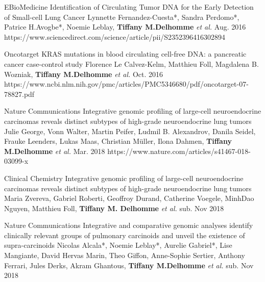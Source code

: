 \begin{cventries}
  \cvpublicationentry
    {EBioMedicine} %
    {Identification of Circulating Tumor DNA for the Early Detection of Small-cell Lung Cancer} %
    {Lynnette Fernandez-Cuesta*, Sandra Perdomo*, Patrice H.Avogbe*, Noemie Leblay, \textbf{Tiffany M.Delhomme} \textit{et al.}} %
    {}
    {Aug. 2016} %
    {https://www.sciencedirect.com/science/article/pii/S2352396416302894}

  \cvpublicationentry
    {Oncotarget} %
    {KRAS mutations in blood circulating cell-free DNA: a pancreatic
cancer case-control study} %
    {Florence Le Calvez-Kelm, Matthieu Foll, Magdalena B. Wozniak, \textbf{Tiffany M.Delhomme} \textit{et al.}} %
    {}
    {Oct. 2016} %
    {https://www.ncbi.nlm.nih.gov/pmc/articles/PMC5346680/pdf/oncotarget-07-78827.pdf}

  \cvpublicationentry
    {Nature Communications} %
    {Integrative genomic profiling of large-cell neuroendocrine carcinomas reveals distinct subtypes of high-grade neuroendocrine lung tumors} %
    {Julie George, Vonn Walter, Martin Peifer, Ludmil B. Alexandrov, Danila Seidel, Frauke Leenders, Lukas Maas, Christian Müller, Ilona Dahmen, \textbf{Tiffany M.Delhomme} \textit{et al.}} %
    {}
    {Mar. 2018} %
    {https://www.nature.com/articles/s41467-018-03099-x}


	\cvpublicationentry
    {Clinical Chemistry} %
    {Integrative genomic profiling of large-cell neuroendocrine carcinomas reveals distinct subtypes of high-grade neuroendocrine lung tumors} %
    {Maria Zvereva, Gabriel Roberti, Geoffroy Durand, Catherine Voegele, MinhDao Nguyen, Matthieu Foll, \textbf{Tiffany M. Delhomme} \textit{et al.}} %
    {}
    {sub. Nov 2018} %
    {}

	\cvpublicationentry
    {Nature Communications} %
    {Integrative and comparative genomic analyses identify clinically relevant groups of pulmonary carcinoids and unveil the existence of supra-carcinoids} %
    {Nicolas Alcala*, Noemie Leblay*, Aurelie Gabriel*, Lise Mangiante, David Hervas Marin, Theo Giffon, Anne-Sophie Sertier, Anthony Ferrari, Jules
Derks, Akram Ghantous, \textbf{Tiffany M.Delhomme} \textit{et al.}} %
    {}
    {sub. Nov 2018} %
    {}


\end{cventries}
